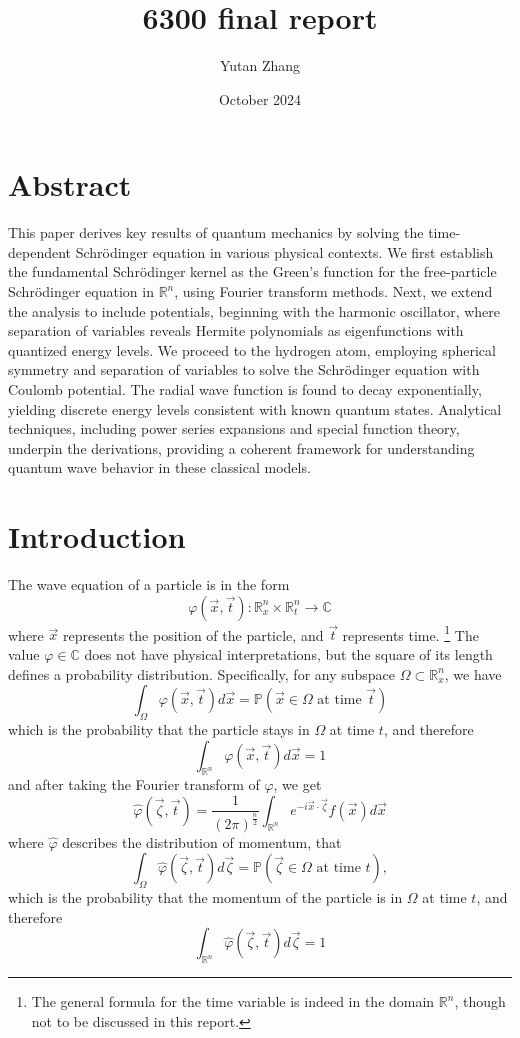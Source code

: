 \documentclass[a4paper,12pt]{report}
\title{6300 final report}
\author{Yutan Zhang}
\date{October 2024}
\begin{document}
\maketitle

\section{Abstract}
\hspace*{1.5em}This paper derives key results of quantum mechanics by solving the time-dependent Schrödinger equation in various physical contexts. We first establish the fundamental Schrödinger kernel as the Green’s function for the free-particle Schrödinger equation in \( \mathbb{R}^n \), using Fourier transform methods. Next, we extend the analysis to include potentials, beginning with the harmonic oscillator, where separation of variables reveals Hermite polynomials as eigenfunctions with quantized energy levels. We proceed to the hydrogen atom, employing spherical symmetry and separation of variables to solve the Schrödinger equation with Coulomb potential. The radial wave function is found to decay exponentially, yielding discrete energy levels consistent with known quantum states. Analytical techniques, including power series expansions and special function theory, underpin the derivations, providing a coherent framework for understanding quantum wave behavior in these classical models.
\section{Introduction}
\hspace*{1.5em}The wave equation of a particle is in the form
\[\varphi(\vec{x}, \vec{t}): \mathbb{R}_x^n \times \mathbb{R}_t^n \to \mathbb{C} \tag{1}\]
where \(\vec{x}\) represents the position of the particle, and \(\vec{t}\) represents time. 
\footnote{The general formula for the time variable is indeed in the domain \(\mathbb{R}^n\), though not to be discussed in this report. }
The value \(\varphi \in \mathbb{C}\) does not have physical interpretations, but the square of its length defines a probability distribution. Specifically, for any subspace \(\Omega \subset \mathbb{R}_x^n\), we have 
\[\int_{\Omega} \varphi(\vec{x}, \vec{t}) d\vec{x} = \mathbb{P}(\vec{x} \in \Omega \text{ at time } \vec{t}) \tag{2}\]
which is the probability that the particle stays in \(\Omega\) at time \(t\), and therefore 
\[\int_{\mathbb{R}^n} \varphi(\vec{x}, \vec{t}) d\vec{x} = 1\]
and after taking the Fourier transform of \(\varphi\), we get 
\[\hat{\varphi}(\vec{\zeta}, \vec{t}) = \frac{1}{(2\pi)^{\frac{n}{2}}} \int_{\mathbb{R}^n} e^{-i\vec{x} \cdot \vec{\zeta}} f(\vec{x}) d\vec{x} \tag{3}\]
where \(\hat{\varphi}\) describes the distribution of momentum, that  \[\int_{\Omega} \hat{\varphi}(\vec{\zeta}, \vec{t}) d\vec{\zeta} = \mathbb{P} (\vec{\zeta} \in \Omega \text{ at time } t),\]
which is the probability that the momentum of the particle is in \(\Omega\) at time \(t\), and therefore 
\[\int_{\mathbb{R}^n} \hat{\varphi}(\vec{\zeta}, \vec{t}) d\vec{\zeta} = 1 \]
\end{document}
